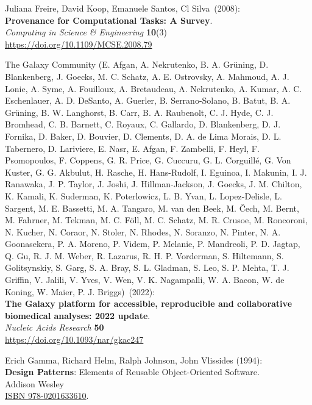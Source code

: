 \begin{thebibliography}{9}
Juliana Freire, David Koop, Emanuele Santos, Cl Silva~(2008): \\
\textbf{Provenance for Computational Tasks: A Survey}.\\
\emph{Computing in Science \& Engineering} \textbf{10}(3) \\
\url{https://doi.org/10.1109/MCSE.2008.79}

The Galaxy Community (E. Afgan, A. Nekrutenko, B. A. Grüning, D. Blankenberg, J. Goecks, M. C. Schatz, A. E. Ostrovsky, A. Mahmoud, A. J. Lonie, A. Syme, A. Fouilloux, A. Bretaudeau, A. Nekrutenko, A. Kumar, A. C. Eschenlauer, A. D. DeSanto, A. Guerler, B. Serrano-Solano, B. Batut, B. A. Grüning, B. W. Langhorst, B. Carr, B. A. Raubenolt, C. J. Hyde, C. J. Bromhead, C. B. Barnett, C. Royaux, C. Gallardo, D. Blankenberg, D. J. Fornika, D. Baker, D. Bouvier, D. Clements, D. A. de Lima Morais, D. L. Tabernero, D. Lariviere, E. Nasr, E. Afgan, F. Zambelli, F. Heyl, F. Psomopoulos, F. Coppens, G. R. Price, G. Cuccuru, G. L. Corguillé, G. Von Kuster, G. G. Akbulut, H. Rasche, H. Hans-Rudolf, I. Eguinoa, I. Makunin, I. J. Ranawaka, J. P. Taylor, J. Joshi, J. Hillman-Jackson, J. Goecks, J. M. Chilton, K. Kamali, K. Suderman, K. Poterlowicz, L. B. Yvan, L. Lopez-Delisle, L. Sargent, M. E. Bassetti, M. A. Tangaro, M. van den Beek, M. Čech, M. Bernt, M. Fahrner, M. Tekman, M. C. Föll, M. C. Schatz, M. R. Crusoe, M. Roncoroni, N. Kucher, N. Coraor, N. Stoler, N. Rhodes, N. Soranzo, N. Pinter, N. A. Goonasekera, P. A. Moreno, P. Videm, P. Melanie, P. Mandreoli, P. D. Jagtap, Q. Gu, R. J. M. Weber, R. Lazarus, R. H. P. Vorderman, S. Hiltemann, S. Golitsynskiy, S. Garg, S. A. Bray, S. L. Gladman, S. Leo, S. P. Mehta, T. J. Griffin, V. Jalili, V. Yves, V. Wen, V. K. Nagampalli, W. A. Bacon, W. de Koning, W. Maier, P. J. Briggs)~(2022): \\
\textbf{The Galaxy platform for accessible, reproducible and collaborative biomedical analyses: 2022 update}.\\
\emph{Nucleic Acids Research} \textbf{50}\\
\url{https://doi.org/10.1093/nar/gkac247}

Erich Gamma, Richard Helm, Ralph Johnson, John Vlissides (1994):\\
\textbf{Design Patterns}: Elements of Reusable Object-Oriented Software. \\
Addison Wesley \\ 
\href{https://identifiers.org/isbn/9780201633610}{ISBN 978-0201633610}.


\end{thebibliography}
